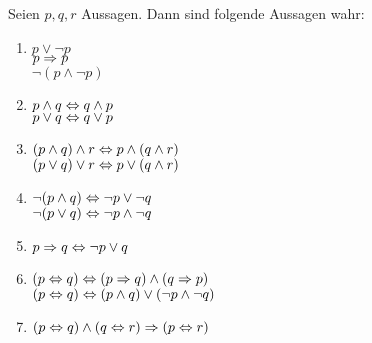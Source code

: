 \begin{satz}
    Seien $p,q,r$ Aussagen.
    Dann sind folgende Aussagen wahr:
    \begin{enumerate}[label=(\roman*)]
        \item $p \lor \neg p$ \\
        $p \Rightarrow{} p$\\
        $\neg (p \land \neg p)$
        \item $p\land q \Leftrightarrow{} q \land p$ \\
        $p\lor q \Leftrightarrow{} q \lor p$
        \item $(p\land q) \land r \Leftrightarrow{} p \land (q\land r)$ \\
        $(p\lor q) \lor r \Leftrightarrow{} p \lor (q\land r)$
        \item $\neg(p\land q) \Leftrightarrow{} \neg p \lor \neg q$ \\
        $\neg(p\lor q) \Leftrightarrow{} \neg p \land \neg q$
        \item $p\Rightarrow{} q \Leftrightarrow{} \neg p \lor q$ 
        \item $(p\Leftrightarrow{} q) \Leftrightarrow{} (p\Rightarrow{} q) \land (q\Rightarrow{} p)$ \\
        $(p\Leftrightarrow{} q) \Leftrightarrow{} (p\land q) \lor (\neg p \land \neg q)$
        \item $(p\Leftrightarrow{} q) \land (q\Leftrightarrow{} r) \Rightarrow{} (p \Leftrightarrow{} r)$ 
    \end{enumerate}
\end{satz}

\newpage